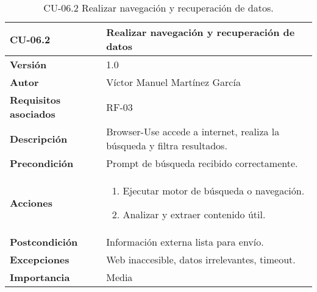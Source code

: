 \begin{table}[p]
    \centering
    \begin{tabularx}{\linewidth}{ p{} p{} }
        \toprule
        \textbf{CU-06.2}    & \textbf{Realizar navegación y recuperación de datos}\\
        \toprule
        \textbf{Versión}              & 1.0 \\
        \textbf{Autor}                & Víctor Manuel Martínez García \\
        \textbf{Requisitos asociados} & RF-03 \\
        \textbf{Descripción}          & Browser-Use accede a internet, realiza la búsqueda y filtra resultados.\\
        \textbf{Precondición}         & Prompt de búsqueda recibido correctamente.\\
        \textbf{Acciones}             &
        \begin{enumerate}
          \item Ejecutar motor de búsqueda o navegación.
          \item Analizar y extraer contenido útil.
        \end{enumerate}\\
        \textbf{Postcondición}        & Información externa lista para envío.\\
        \textbf{Excepciones}          & Web inaccesible, datos irrelevantes, timeout.\\
        \textbf{Importancia}          & Media \\
        \bottomrule
    \end{tabularx}
    \caption{CU-06.2 Realizar navegación y recuperación de datos.}
    \label{CU-06.2 Realizar navegacion y recuperacion de datos}
\end{table}


